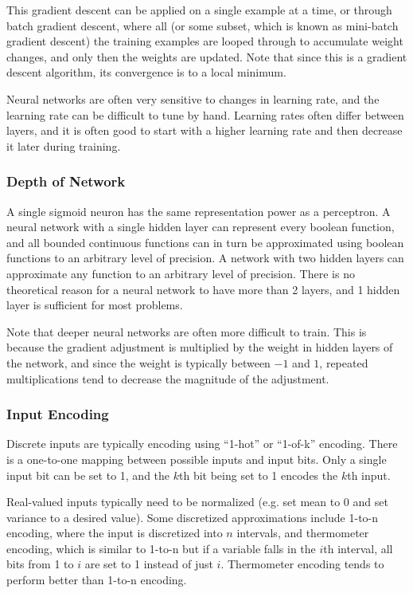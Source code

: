 \documentclass[12pt,titlepage]{article}
\begin{document}
        This gradient descent can be applied on a single example at a time, or through batch gradient descent, where all (or some subset, which is known as mini-batch
        gradient descent) the training examples are looped through to accumulate weight changes, and only then the weights are updated. Note that since this is a gradient
        descent algorithm, its convergence is to a local minimum.

        Neural networks are often very sensitive to changes in learning rate, and the learning rate can be difficult to tune by hand. Learning rates often differ between
        layers, and it is often good to start with a higher learning rate and then decrease it later during training.

      \subsubsection{Depth of Network}
        A single sigmoid neuron has the same representation power as a perceptron. A neural network with a single hidden layer can represent every boolean function, and
        all bounded continuous functions can in turn be approximated using boolean functions to an arbitrary level of precision. A network with two hidden layers can
        approximate any function to an arbitrary level of precision. There is no theoretical reason for a neural network to have more than 2 layers, and 1 hidden layer is
        sufficient for most problems.

        Note that deeper neural networks are often more difficult to train. This is because the gradient adjustment is multiplied by the weight in hidden layers of the
        network, and since the weight is typically between $-1$ and $1$, repeated multiplications tend to decrease the magnitude of the adjustment.

      \subsubsection{Input Encoding}
        Discrete inputs are typically encoding using ``1-hot'' or ``1-of-k'' encoding. There is a one-to-one mapping between possible inputs and input bits. Only a single
        input bit can be set to 1, and the $k$th bit being set to 1 encodes the $k$th input.

        Real-valued inputs typically need to be normalized (e.g. set mean to 0 and set variance to a desired value). Some discretized approximations include 1-to-n
        encoding, where the input is discretized into $n$ intervals, and thermometer encoding, which is similar to 1-to-n but if a variable falls in the $i$th interval,
        all bits from 1 to $i$ are set to 1 instead of just $i$. Thermometer encoding tends to perform better than 1-to-n encoding.
\end{document}
